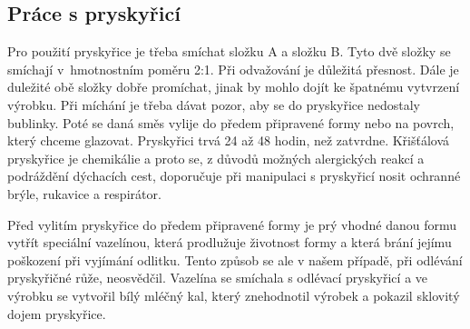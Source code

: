 \subsection*{Práce s pryskyřicí}

Pro použití pryskyřice je třeba smíchat složku A a složku B. Tyto dvě složky se  smíchají v~hmotnostním poměru 2:1. Při odvažování je důležitá přesnost. Dále je duležité obě složky dobře promíchat, jinak by mohlo dojít ke špatnému vytvrzení výrobku. Při míchání je třeba dávat pozor, aby se do pryskyřice nedostaly bublinky. Poté se daná směs vylije do předem připravené formy nebo na povrch, který chceme glazovat. Pryskyřici trvá 24 až 48 hodin, než zatvrdne. Křišťálová pryskyřice je chemikálie a proto se, z důvodů možných alergických reakcí a podráždění dýchacích cest, doporučuje při manipulaci s pryskyřicí nosit ochranné brýle, rukavice a respirátor. 

Před vylitím pryskyřice do předem připravené formy je prý vhodné danou formu vytřít speciální vazelínou, která prodlužuje životnost formy a která brání jejímu poškození při vyjímání odlitku. Tento způsob se ale v našem případě, při odlévání pryskyřičné růže, neosvědčil. Vazelína se smíchala s odlévací pryskyřicí a ve výrobku se vytvořil bílý mléčný kal, který znehodnotil výrobek a pokazil sklovitý dojem pryskyřice.







